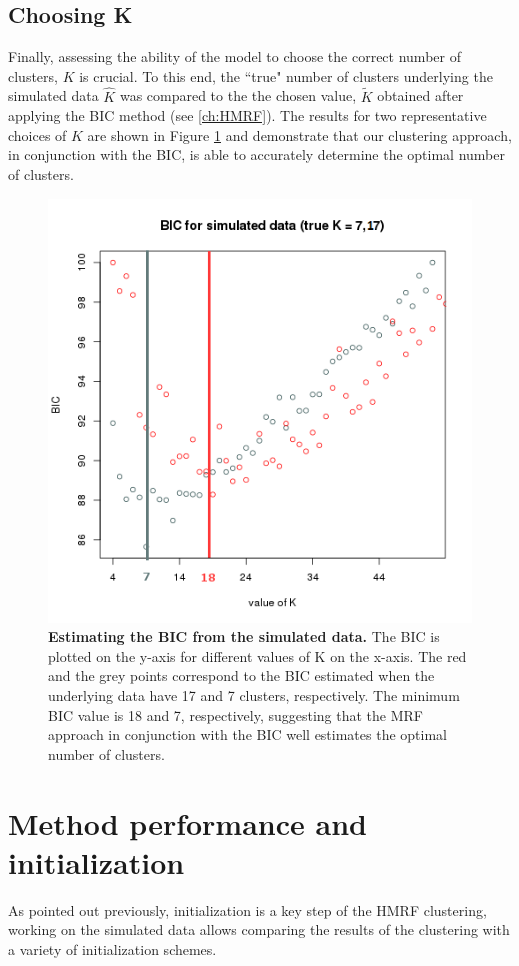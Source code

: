 	\subsection{Choosing K}
	
Finally, assessing the ability of the model to choose the correct number of clusters, $K$ is crucial. To this end, the ``true" number of clusters underlying the simulated data $\hat{K}$ was compared to the the chosen value, $\widetilde{K}$ obtained after applying the BIC method (see \ref{ch:HMRF}). The results for two representative choices of $K$ are shown in Figure \ref{fig:simulatedK} and demonstrate that our clustering approach, in conjunction with the BIC, is able to accurately determine the optimal number of clusters.\\

	\begin{figure}[H]
\centerline{\includegraphics[width=0.8\linewidth]{gfx/chapter5/simulated_k.png}}
\caption{{\bf Estimating the BIC from the simulated data.} The BIC is plotted on the y-axis for different values of K on the x-axis. The red and the grey points correspond to the BIC estimated when the underlying data have 17 and 7 clusters, respectively. The minimum BIC value is 18 and 7, respectively, suggesting that the MRF approach in conjunction with the BIC well estimates the optimal number of clusters.}
\label{fig:simulatedK}
	\end{figure}

\section{Method performance and initialization}\label{sec:method_comparison}
As pointed out previously, initialization is a key step of the HMRF clustering, working on the simulated data allows comparing the results of the clustering with a variety of initialization schemes.
